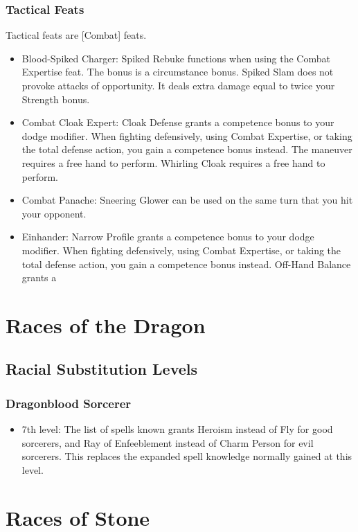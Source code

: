 \subsubsection{Tactical Feats}
Tactical feats are [Combat] feats.
\begin{itemize}
\item Blood-Spiked Charger: Spiked Rebuke functions when using the Combat Expertise feat. The bonus is a circumstance bonus. Spiked Slam does not provoke attacks of opportunity. It deals extra damage equal to twice your Strength bonus.
\item Combat Cloak Expert: Cloak Defense grants a  competence bonus to your dodge modifier. When fighting defensively, using Combat Expertise, or taking the total defense action, you gain a  competence bonus instead. The maneuver requires a free hand to perform. Whirling Cloak requires a free hand to perform.
\item Combat Panache: Sneering Glower can be used on the same turn that you hit your opponent.
\item Einhander: Narrow Profile grants a  competence bonus to your dodge modifier. When fighting defensively, using Combat Expertise, or taking the total defense action, you gain a  competence bonus instead. Off-Hand Balance grants a 
\end{itemize}

\section{Races of the Dragon}
\subsection{Racial Substitution Levels}
\subsubsection{Dragonblood Sorcerer}
\begin{itemize}
\item 7th level: The list of spells known grants Heroism instead of Fly for good sorcerers, and Ray of Enfeeblement instead of Charm Person for evil sorcerers. This replaces the expanded spell knowledge normally gained at this level.
\end{itemize}

\section{Races of Stone}
